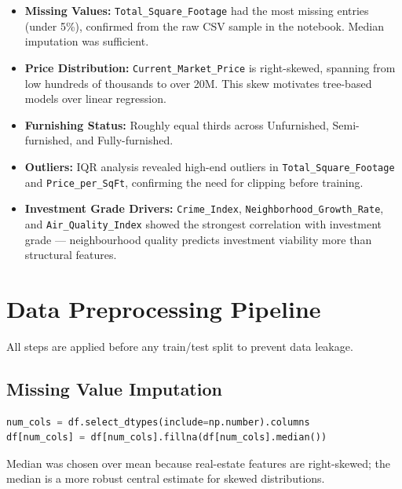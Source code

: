 \documentclass[12pt,a4paper]{article}
\begin{document}
\begin{itemize}
    \item \textbf{Missing Values:} \texttt{Total\_Square\_Footage} had the most
          missing entries (under 5\%), confirmed from the raw CSV sample in the
          notebook. Median imputation was sufficient.
    \item \textbf{Price Distribution:} \texttt{Current\_Market\_Price} is
          right-skewed, spanning from low hundreds of thousands to over 20M.
          This skew motivates tree-based models over linear regression.
    \item \textbf{Furnishing Status:} Roughly equal thirds across Unfurnished,
          Semi-furnished, and Fully-furnished.
    \item \textbf{Outliers:} IQR analysis revealed high-end outliers in
          \texttt{Total\_Square\_Footage} and \texttt{Price\_per\_SqFt},
          confirming the need for clipping before training.
    \item \textbf{Investment Grade Drivers:} \texttt{Crime\_Index},
          \texttt{Neighborhood\_Growth\_Rate}, and \texttt{Air\_Quality\_Index}
          showed the strongest correlation with investment grade --- neighbourhood
          quality predicts investment viability more than structural features.
\end{itemize}

\section{Data Preprocessing Pipeline}

All steps are applied before any train/test split to prevent data leakage.

\subsection{Missing Value Imputation}

\begin{lstlisting}[language=Python, caption={Median Imputation}]
num_cols = df.select_dtypes(include=np.number).columns
df[num_cols] = df[num_cols].fillna(df[num_cols].median())
\end{lstlisting}

Median was chosen over mean because real-estate features are right-skewed; the
median is a more robust central estimate for skewed distributions.
\end{document}
